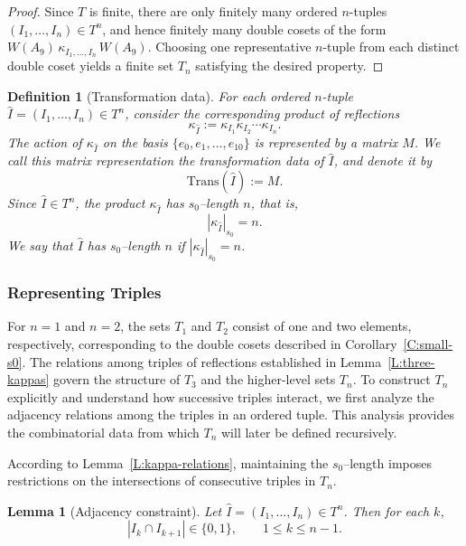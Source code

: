 \documentclass[11pt]{amsart}
\numberwithin{equation}{section}
\newtheorem{lem}[thm]{Lemma}
\newtheorem{defn}[thm]{Definition}
\begin{document}
\begin{proof}
Since $T$ is finite, there are only finitely many ordered $n$-tuples $(I_1,\dots,I_n)\in T^n$,
and hence finitely many double cosets of the form
$W(A_9)\,\kappa_{I_1,\dots,I_n}\,W(A_9)$.
Choosing one representative $n$-tuple from each distinct double coset yields
a finite set $T_n$ satisfying the desired property.
\end{proof}

\begin{defn}[Transformation data]\label{D:trans-data}
For each ordered $n$-tuple $\widehat I = (I_1,\dots,I_n) \in T^n$,
consider the corresponding product of reflections
\[
\kappa_{\widehat I} := \kappa_{I_1}\kappa_{I_2}\cdots\kappa_{I_n}.
\]
The action of $\kappa_{\widehat I}$ on the basis
$\{e_0,e_1,\dots,e_{10}\}$
is represented by a matrix $M$.
We call this matrix representation the \emph{transformation data} of $\widehat I$,
and denote it by
\[
\mathrm{Trans}(\widehat I) := M.
\]
Since $\widehat I\in T^n$, the product $\kappa_{\widehat I}$ has
$s_0$--length $n$, that is,
\[
|\kappa_{\widehat I}|_{s_0} = n.
\]
We say that $\widehat I$ has \emph{$s_0$--length} $n$
if $|\kappa_{\widehat I}|_{s_0}=n$.
\end{defn}


\subsubsection{Representing Triples}\label{SSS:triples}

For $n=1$ and $n=2$, the sets $T_1$ and $T_2$ consist of one and two elements, respectively,
corresponding to the double cosets described in Corollary~\ref{C:small-s0}.
The relations among triples of reflections established in
Lemma~\ref{L:three-kappas}
govern the structure of $T_3$ and the higher-level sets $T_n$.
To construct $T_n$ explicitly and understand how successive triples interact,
we first analyze the adjacency relations among the triples in an ordered tuple.
This analysis provides the combinatorial data from which $T_n$ will later be defined recursively.

\medskip
According to Lemma~\ref{L:kappa-relations}, maintaining the $s_0$--length
imposes restrictions on the intersections of consecutive triples in $T_n$.

\begin{lem}[Adjacency constraint]\label{L:adj-gap1}
Let $\widehat I=(I_1,\dots,I_n)\in T^n$.
Then for each $k$,
\[
|I_k\cap I_{k+1}|\in\{0,1\}, \qquad 1\le k\le n-1.
\]
\end{lem}
\end{document}
